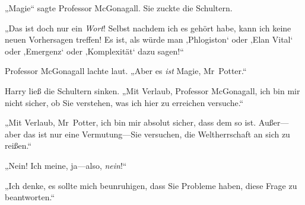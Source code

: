 „Magie“ sagte Professor McGonagall. Sie zuckte die Schultern.

„Das ist doch nur ein \emph{Wort}! Selbst nachdem ich es gehört habe, kann ich keine neuen Vorhersagen treffen! Es ist, als würde man ‚Phlogiston‘ oder ‚Elan Vital‘ oder ‚Emergenz‘ oder ‚Komplexität‘ dazu sagen!“

Professor McGonagall lachte laut. „Aber es \emph{ist} Magie, Mr~Potter.“

Harry ließ die Schultern sinken. „Mit Verlaub, Professor McGonagall, ich bin mir nicht sicher, ob Sie verstehen, was ich hier zu erreichen versuche.“

„Mit Verlaub, Mr~Potter, ich bin mir absolut sicher, dass dem so ist. Außer—aber das ist nur eine Vermutung—Sie versuchen, die Weltherrschaft an sich zu reißen.“

„Nein! Ich meine, ja—also, \emph{nein}!“

„Ich denke, es sollte mich beunruhigen, dass Sie Probleme haben, diese Frage zu beantworten.“

